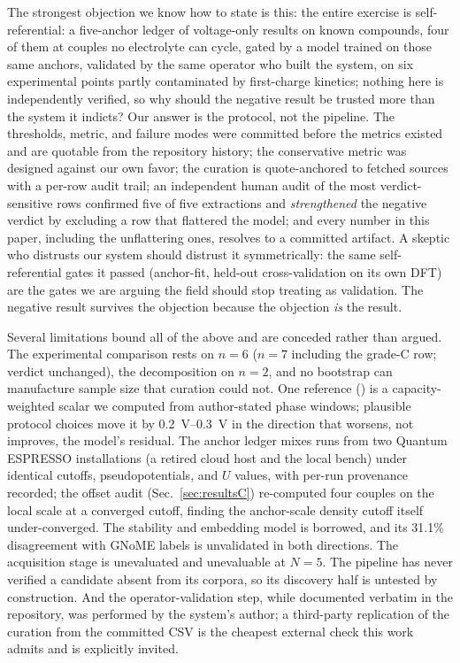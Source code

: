 \documentclass[reprint,aps,prb,amsmath,amssymb,nofootinbib,longbibliography]{revtex4-2}
\begin{document}
The strongest objection we know how to state is this: the entire exercise is
self-referential: a five-anchor ledger of voltage-only results on known
compounds, four of them at couples no electrolyte can cycle, gated by a
model trained on those same anchors, validated by the same operator who
built the system, on six experimental points partly contaminated by
first-charge kinetics; nothing here is independently verified, so why should
the negative result be trusted more than the system it indicts? Our answer
is the protocol, not the pipeline. The thresholds, metric, and failure
modes were committed before the metrics existed and are quotable from the
repository history; the conservative metric was designed against our own
favor; the curation is quote-anchored to fetched sources with a per-row
audit trail; an independent human audit of the most verdict-sensitive rows
confirmed five of five extractions and \emph{strengthened} the negative
verdict by excluding a row that flattered the model; and every number in
this paper, including the unflattering ones, resolves to a committed
artifact. A skeptic who distrusts our system should distrust it
symmetrically: the same self-referential gates it passed (anchor-fit,
held-out cross-validation on its own DFT) are the gates we are arguing the
field should stop treating as validation. The negative result survives the
objection because the objection \emph{is} the result.

Several limitations bound all of the above and are conceded rather than
argued. The experimental comparison rests on $n=6$ ($n=7$ including the
grade-C row; verdict unchanged), the decomposition on $n=2$, and no
bootstrap can manufacture sample size that curation could not. One
reference () is a capacity-weighted scalar we computed from
author-stated phase windows; plausible protocol choices move it by
\SIrange{0.2}{0.3}{\volt} in the direction that worsens, not improves, the
model's residual. The anchor ledger mixes runs from two Quantum ESPRESSO
installations (a retired cloud host and the local bench) under identical
cutoffs, pseudopotentials, and $U$ values, with per-run provenance recorded;
the offset audit (Sec.~\ref{sec:resultsC}) re-computed four couples on the
local scale at a converged cutoff, finding the anchor-scale density cutoff
itself under-converged. The stability and embedding model is borrowed,
and its 31.1\% disagreement with GNoME labels is unvalidated in both
directions. The acquisition stage is unevaluated and unevaluable at $N=5$.
The pipeline has never verified a candidate absent from its corpora, so its
discovery half is untested by construction. And the operator-validation
step, while documented verbatim in the repository, was performed by the
system's author; a third-party replication of the curation from the
committed CSV is the cheapest external check this work admits and is
explicitly invited.
\end{document}
